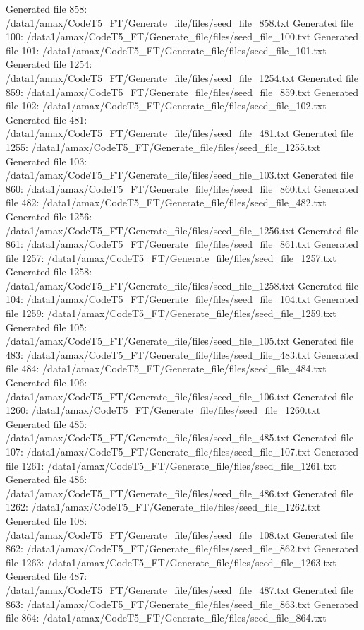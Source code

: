 Generated file 858: /data1/amax/CodeT5_FT/Generate_file/files/seed_file_858.txt
Generated file 100: /data1/amax/CodeT5_FT/Generate_file/files/seed_file_100.txt
Generated file 101: /data1/amax/CodeT5_FT/Generate_file/files/seed_file_101.txt
Generated file 1254: /data1/amax/CodeT5_FT/Generate_file/files/seed_file_1254.txt
Generated file 859: /data1/amax/CodeT5_FT/Generate_file/files/seed_file_859.txt
Generated file 102: /data1/amax/CodeT5_FT/Generate_file/files/seed_file_102.txt
Generated file 481: /data1/amax/CodeT5_FT/Generate_file/files/seed_file_481.txt
Generated file 1255: /data1/amax/CodeT5_FT/Generate_file/files/seed_file_1255.txt
Generated file 103: /data1/amax/CodeT5_FT/Generate_file/files/seed_file_103.txt
Generated file 860: /data1/amax/CodeT5_FT/Generate_file/files/seed_file_860.txt
Generated file 482: /data1/amax/CodeT5_FT/Generate_file/files/seed_file_482.txt
Generated file 1256: /data1/amax/CodeT5_FT/Generate_file/files/seed_file_1256.txt
Generated file 861: /data1/amax/CodeT5_FT/Generate_file/files/seed_file_861.txt
Generated file 1257: /data1/amax/CodeT5_FT/Generate_file/files/seed_file_1257.txt
Generated file 1258: /data1/amax/CodeT5_FT/Generate_file/files/seed_file_1258.txt
Generated file 104: /data1/amax/CodeT5_FT/Generate_file/files/seed_file_104.txt
Generated file 1259: /data1/amax/CodeT5_FT/Generate_file/files/seed_file_1259.txt
Generated file 105: /data1/amax/CodeT5_FT/Generate_file/files/seed_file_105.txt
Generated file 483: /data1/amax/CodeT5_FT/Generate_file/files/seed_file_483.txt
Generated file 484: /data1/amax/CodeT5_FT/Generate_file/files/seed_file_484.txt
Generated file 106: /data1/amax/CodeT5_FT/Generate_file/files/seed_file_106.txt
Generated file 1260: /data1/amax/CodeT5_FT/Generate_file/files/seed_file_1260.txt
Generated file 485: /data1/amax/CodeT5_FT/Generate_file/files/seed_file_485.txt
Generated file 107: /data1/amax/CodeT5_FT/Generate_file/files/seed_file_107.txt
Generated file 1261: /data1/amax/CodeT5_FT/Generate_file/files/seed_file_1261.txt
Generated file 486: /data1/amax/CodeT5_FT/Generate_file/files/seed_file_486.txt
Generated file 1262: /data1/amax/CodeT5_FT/Generate_file/files/seed_file_1262.txt
Generated file 108: /data1/amax/CodeT5_FT/Generate_file/files/seed_file_108.txt
Generated file 862: /data1/amax/CodeT5_FT/Generate_file/files/seed_file_862.txt
Generated file 1263: /data1/amax/CodeT5_FT/Generate_file/files/seed_file_1263.txt
Generated file 487: /data1/amax/CodeT5_FT/Generate_file/files/seed_file_487.txt
Generated file 863: /data1/amax/CodeT5_FT/Generate_file/files/seed_file_863.txt
Generated file 864: /data1/amax/CodeT5_FT/Generate_file/files/seed_file_864.txt
